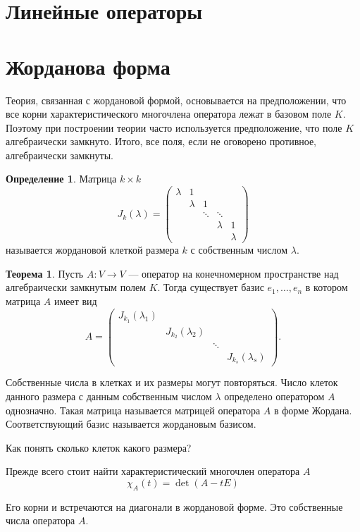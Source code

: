 \documentclass[10pt,a4paper,oneside]{book}
\theoremstyle{definition}
\newtheorem{defn}{Определение}
\newtheorem{thm}{Теорема}
\def\thrm{\begin{thm}}
\def\ethrm{\end{thm}}
\def\dfn{\begin{defn}}
\def\edfn{\end{defn}}
\begin{document}
\section{Линейные операторы}


\section{Жорданова форма}

Теория, связанная с жордановой формой, основывается на предположении, что все корни характеристического
многочлена оператора лежат в базовом поле $K$. Поэтому при построении теории часто используется предположение,
что поле $K$ алгебраически замкнуто. Итого, все поля, если не оговорено противное, алгебраически замкнуты.

\dfn
Матрица $k\times k$
$$J_k(\lambda) = \begin{pmatrix}
\lambda& 1&& \\
& \lambda &1& \\
&&\ddots &\ddots& \\
&  && \lambda & 1\\
&  &&& \lambda
\end{pmatrix}
$$
называется жордановой клеткой размера $k$ с собственным числом $\lambda$.
\edfn

\thrm Пусть $A\colon V \to V$ --- оператор на конечномерном пространстве над алгебраически замкнутым полем $K$.
Тогда существует базис $e_1,\dots, e_n$ в котором матрица $A$ имеет вид
$$A=\begin{pmatrix}
J_{k_1}(\lambda_1) &&&\\
& J_{k_2}(\lambda_2) &&\\
&& \ddots& \\
&&& J_{k_s}(\lambda_s)

\end{pmatrix}.
$$

Собственные числа в клетках и их размеры могут повторяться. Число клеток данного размера с данным собственным
числом $\lambda$ определено оператором $A$ однозначно. Такая матрица называется матрицей оператора $A$ в форме Жордана.
Соответствующий базис называется жордановым базисом.
\ethrm


Как понять сколько клеток какого размера?

Прежде всего стоит найти характеристический многочлен  оператора $A$ 
$$\chi_A(t)=\det (A-tE)$$

Его корни и встречаются на диагонали в жордановой форме. Это собственные числа оператора $A$.
\end{document}
